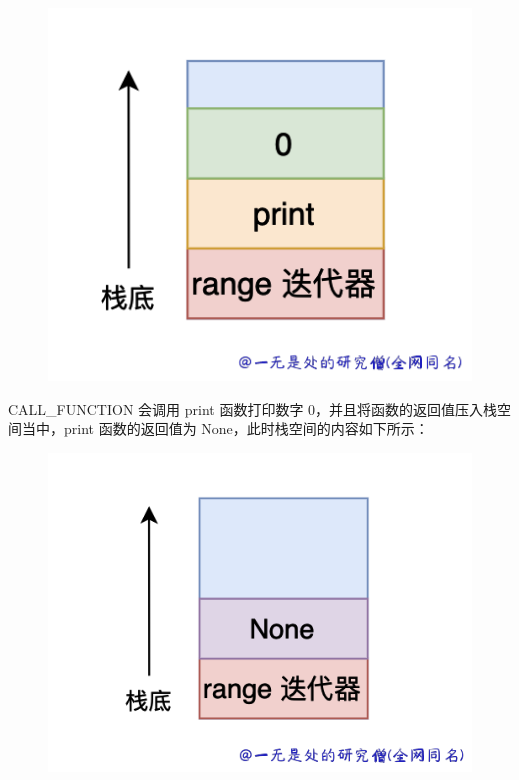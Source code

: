     \begin{figure}[H]
        \centering
            \includegraphics[scale=.25]{images/69-bytecode.png}
						\caption{ }
        \label{fig:my_label}
    \end{figure}
    
CALL\_FUNCTION 会调用 print 函数打印数字 0，并且将函数的返回值压入栈空间当中，print 函数的返回值为 None，此时栈空间的内容如下所示：

    \begin{figure}[H]
        \centering
            \includegraphics[scale=.25]{images/70-bytecode.png}
						\caption{ }
        \label{fig:my_label}
    \end{figure}
    
